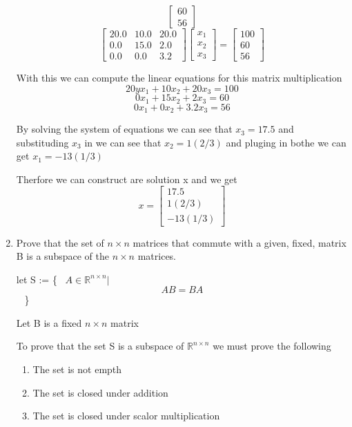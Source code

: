 \documentclass{article}
\begin{document}
\begin{enumerate}
\[\begin{bmatrix}
        60 \\
        56
      \end{bmatrix}
    \]
    \[
      \begin{bmatrix}
        20.0 & 10.0 & 20.0 \\
        0.0 & 15.0 & 2.0 \\
        0.0 & 0.0 & 3.2 
      \end{bmatrix}
      \begin{bmatrix}
        x_1 \\
        x_2 \\
        x_3 
      \end{bmatrix}
      =
      \begin{bmatrix}
        100 \\
        60 \\
        56
      \end{bmatrix}
    \]
    \par
    With this we can compute the linear equations for this matrix multiplication
    \begin{equation}
      20yx_1+10x_2+20x_3 = 100
    \end{equation}
    \begin{equation}
      0x_1+15x_2+2x_3 = 60
    \end{equation}
    \begin{equation}
      0x_1+0x_2+3.2x_3 = 56
    \end{equation}
    \par
    By solving the system of equations we can see that $x_3 = 17.5$ and substituding $x_3$ in we can see that $x_2 = 1(2/3)$ and pluging in bothe we can get $x_1 = -13(1/3)$
    \par
    Therfore we can construct are solution x and we get
    \[
      x = 
      \begin{bmatrix}
        17.5 \\
        1(2/3) \\
        -13(1/3) 
      \end{bmatrix}
    \]
  \item Prove that the set of $n \times n$ matrices that commute with a given, fixed, matrix B is a subspace of the $n \times n$ matrices.

    \begin{center}
      let S :=
      \left
      \{
        \mbox
        {
          $A \in \mathbb{R}^{n \times n}|$
          \[
            AB = BA
          \]
        }
        \right
      \}
      \par
      Let B is a fixed $n \times n$ matrix
    \end{center}
    \par
    To prove that the set S is a subspace of $\mathbb{R}^{n \times n}$ we must prove the following
    \begin{enumerate}
      \item The set is not empth
      \item The set is closed under addition
      \item The set is closed under scalor multiplication
    \end{enumerate}


\end{enumerate}
\end{document}
